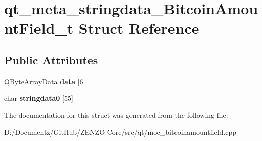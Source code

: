 \hypertarget{structqt__meta__stringdata___bitcoin_amount_field__t}{}\section{qt\+\_\+meta\+\_\+stringdata\+\_\+\+Bitcoin\+Amount\+Field\+\_\+t Struct Reference}
\label{structqt__meta__stringdata___bitcoin_amount_field__t}
\subsection*{Public Attributes}
\begin{DoxyCompactItemize}
\item 
\mbox{\label{structqt__meta__stringdata___bitcoin_amount_field__t_ab99cd44d4bbf3f3058277ae1d6e97b07}} 
Q\+Byte\+Array\+Data {\bfseries data} \mbox{[}6\mbox{]}
\item 
\mbox{\label{structqt__meta__stringdata___bitcoin_amount_field__t_aa93a89a87072f34290acd4c85b6764cd}} 
char {\bfseries stringdata0} \mbox{[}55\mbox{]}
\end{DoxyCompactItemize}


The documentation for this struct was generated from the following file\+:\begin{DoxyCompactItemize}
\item 
D\+:/\+Documentz/\+Git\+Hub/\+Z\+E\+N\+Z\+O-\/\+Core/src/qt/moc\+\_\+bitcoinamountfield.\+cpp\end{DoxyCompactItemize}
